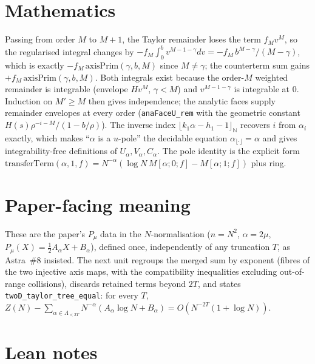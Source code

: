 \documentclass[11pt]{article}
\begin{document}
\section{Mathematics}

Passing from order $M$ to $M+1$, the Taylor remainder loses the term $f_Mv^M$, so the regularised
integral changes by $-f_M\int_0^bv^{M-1-\gamma}dv=-f_M\,b^{M-\gamma}/(M-\gamma)$, which is exactly
$-f_M\,\mathrm{axisPrim}(\gamma,b,M)$ since $M\ne\gamma$; the counterterm sum gains
$+f_M\,\mathrm{axisPrim}(\gamma,b,M)$. Both integrals exist because the order-$M$ weighted remainder
is integrable (envelope $Hv^M$, $\gamma<M$) and $v^{M-1-\gamma}$ is integrable at $0$. Induction on
$M'\ge M$ then gives independence; the analytic faces supply remainder envelopes at every order
(\texttt{anaFaceU\_rem} with the geometric constant $H(s)\rho^{-i-M}/(1-b/\rho)$). The inverse index
$\lfloor k_1\alpha-h_1-1\rfloor_{\mathbb N}$ recovers $i$ from $\alpha_i$ exactly, which makes
``$\alpha$ is a $u$-pole'' the decidable equation $\alpha_{\lfloor\cdot\rfloor}=\alpha$ and gives
integrability-free definitions of $U_\alpha,V_\alpha,C_\alpha$. The pole identity is the explicit
form $\mathrm{transferTerm}(\alpha,1,f)=N^{-\alpha}(\log N\,M[\alpha;0;f]-M[\alpha;1;f])$ plus ring.

\section{Paper-facing meaning}

These are the paper's $P_\mu$ data in the $N$-normalisation ($n=N^2$, $\alpha=2\mu$,
$P_\mu(X)=\tfrac12A_\alpha X+B_\alpha$), defined once, independently of any truncation $T$, as
Astra~\#8 insisted. The next unit regroups the merged sum by exponent (fibres of the two injective
axis maps, with the compatibility inequalities excluding out-of-range collisions), discards retained
terms beyond $2T$, and states \texttt{twoD\_taylor\_tree\_equal}: for every $T$,
$Z(N)-\sum_{\alpha\in\Lambda_{<2T}}N^{-\alpha}(A_\alpha\log N+B_\alpha)=O(N^{-2T}(1+\log N))$.

\section{Lean notes}
\end{document}
